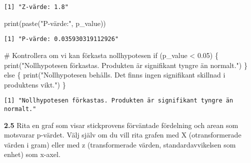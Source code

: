 \documentclass[
  letterpaper,
  DIV=11,
  numbers=noendperiod]{scrartcl}
\newenvironment{Shaded}{\begin{snugshade}}{\end{snugshade}}
\newcommand{\CommentTok}[1]{\textcolor[rgb]{0.37,0.37,0.37}{#1}}
\newcommand{\ControlFlowTok}[1]{\textcolor[rgb]{0.00,0.23,0.31}{#1}}
\newcommand{\FloatTok}[1]{\textcolor[rgb]{0.68,0.00,0.00}{#1}}
\newcommand{\FunctionTok}[1]{\textcolor[rgb]{0.28,0.35,0.67}{#1}}
\newcommand{\NormalTok}[1]{\textcolor[rgb]{0.00,0.23,0.31}{#1}}
\newcommand{\SpecialCharTok}[1]{\textcolor[rgb]{0.37,0.37,0.37}{#1}}
\newcommand{\StringTok}[1]{\textcolor[rgb]{0.13,0.47,0.30}{#1}}
\begin{document}
\begin{verbatim}
[1] "Z-värde: 1.8"
\end{verbatim}

\begin{Shaded}
\begin{Highlighting}[]
\FunctionTok{print}\NormalTok{(}\FunctionTok{paste}\NormalTok{(}\StringTok{"P{-}värde:"}\NormalTok{, p\_value))}
\end{Highlighting}
\end{Shaded}

\begin{verbatim}
[1] "P-värde: 0.035930319112926"
\end{verbatim}

\begin{Shaded}
\begin{Highlighting}[]
\CommentTok{\# Kontrollera om vi kan förkasta nollhypotesen}
\ControlFlowTok{if}\NormalTok{ (p\_value }\SpecialCharTok{\textless{}} \FloatTok{0.05}\NormalTok{) \{}
  \FunctionTok{print}\NormalTok{(}\StringTok{"Nollhypotesen förkastas. Produkten är signifikant tyngre än normalt."}\NormalTok{)}
\NormalTok{\} }\ControlFlowTok{else}\NormalTok{ \{}
  \FunctionTok{print}\NormalTok{(}\StringTok{"Nollhypotesen behålls. Det finns ingen signifikant skillnad i produktens vikt."}\NormalTok{)}
\NormalTok{\}}
\end{Highlighting}
\end{Shaded}

\begin{verbatim}
[1] "Nollhypotesen förkastas. Produkten är signifikant tyngre än normalt."
\end{verbatim}

\textbf{2.5} Rita en graf som visar stickprovens förväntade fördelning
och arean som motsvarar p-värdet. Välj själv om du vill rita grafen med
X (otransformerade värden i gram) eller med z (transformerade värden,
standardavvikelsen som enhet) som x-axel.
\end{document}
